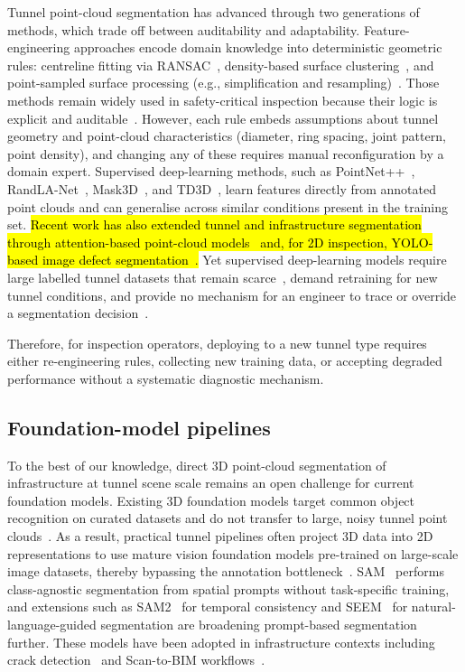 \documentclass[a4paper,fleqn]{cas-dc}
\begin{document}
{Tunnel point-cloud segmentation has advanced through two generations of methods, which trade off between auditability and adaptability. Feature-engineering approaches encode domain knowledge into deterministic geometric rules: centreline fitting via RANSAC~\cite{fischler1981ransac}, density-based surface clustering~\cite{ester1996dbscan}, and point-sampled surface processing (e.g., simplification and resampling)~\cite{pauly2002}. Those methods remain widely used in safety-critical inspection because their logic is explicit and auditable~\cite{weidner2024generalized}. However, each rule embeds assumptions about tunnel geometry and point-cloud characteristics (diameter, ring spacing, joint pattern, point density), and changing any of these requires manual reconfiguration by a domain expert. Supervised deep-learning methods, such as PointNet++~\cite{qi2017pointnet}, RandLA-Net~\cite{hu2020randla}, Mask3D~\cite{schult2023mask3d}, and TD3D~\cite{kolodiazhnyi2024td3d}, learn features directly from annotated point clouds and can generalise across similar conditions present in the training set. \hl{Recent work has also extended tunnel and infrastructure segmentation through attention-based point-cloud models~\cite{wang2026serialformer} and, for 2D inspection, YOLO-based image defect segmentation~\cite{yang2024yologsd, liang2026ecayolo}.} Yet supervised
deep-learning models require large labelled tunnel datasets that remain scarce~\cite{su2024review}, demand retraining for new tunnel conditions, and provide no mechanism for an engineer to trace or override a segmentation decision~\cite{cha2024deep}.

Therefore, for inspection operators, deploying to a new tunnel type requires either re-engineering rules, collecting new training data, or accepting degraded performance without a systematic diagnostic mechanism.

\subsection{Foundation-model pipelines}

To the best of our knowledge, direct 3D point-cloud segmentation of infrastructure at tunnel scene scale remains an open challenge for current foundation models. Existing 3D foundation models target common object recognition on curated datasets and do not transfer to large, noisy tunnel point clouds~\cite{camuffo2022recent, liu2023openshape, guo2023pointbind, xu2024pointllm}. As a result, practical tunnel pipelines often project 3D data into 2D representations to use mature vision foundation models pre-trained on large-scale image datasets, thereby bypassing the annotation bottleneck~\cite{caron2021dino, franceschelli2024training}. SAM~\cite{kirillov2023sam} performs class-agnostic segmentation from spatial prompts without task-specific training, and extensions such as SAM2~\cite{ravi2024sam2} for temporal consistency and SEEM~\cite{zou2023segment} for natural-language-guided segmentation are broadening prompt-based segmentation further. These models have been adopted in infrastructure contexts including crack detection~\cite{ge2024cracksam,ye2024sam} and Scan-to-BIM workflows~\cite{wang2024omni, pan2024zero,ye2026maintenance}.

}
\end{document}
